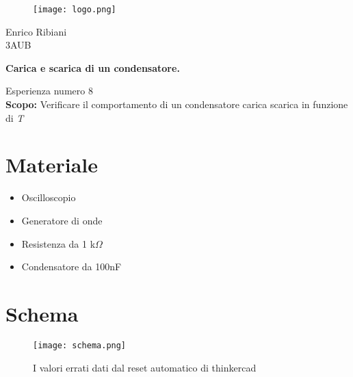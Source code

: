 \documentclass{article}
\begin{document}
    \begin{titlepage}
		\begin{center}
\begin{figure}
    \centering
    \texttt{[image: logo.png]}
    \label{fig:logo}
\end{figure}
\large Enrico Ribiani\\
\large 3AUB\\
\vfill

\Huge{\textbf{Carica e scarica di un condensatore.}}\\
\vfill

\LARGE{Esperienza numero 8 }\\
\vfill
\LARGE{\textbf{Scopo:} Verificare il comportamento di un condensatore carica scarica in funzione di \textit{T}}\\
\vfill
         \end{center}
    \end{titlepage}
        \tableofcontents
        \label{indice}
    \vspace{2\baselineskip} %
    \section{Materiale}
    \begin{itemize}
        \item Oscilloscopio
        \item Generatore di onde
        \item Resistenza da 1 k$\Omega$
        \item Condensatore da 100nF
    \end{itemize}
    
    \vspace{1\baselineskip}
    \section{Schema}
    \begin{figure}[H]
    \centering
    \texttt{[image: schema.png]}
    \caption{I valori errati dati dal reset automatico di thinkercad}
    \label{fig:logo}
\end{figure}
\vspace{.5\baselineskip}
\end{document}
